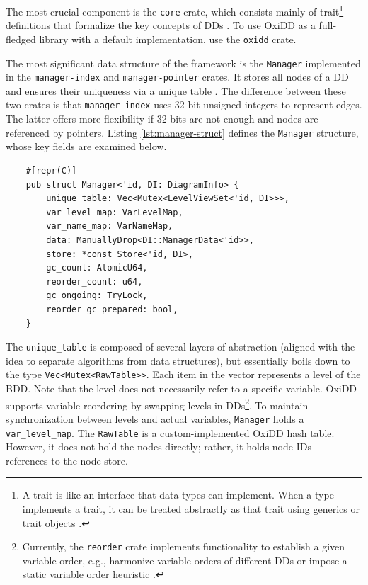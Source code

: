 The most crucial component is the \texttt{core} crate, which consists mainly of trait\footnote{A trait is like an
interface that data types can implement. When a type implements a trait, it can be treated abstractly as that trait
using generics or trait objects \cite[keyword.trait]{rust-docs}.} definitions that formalize the key concepts of DDs
\cite{oxidd}. To use OxiDD as a full-fledged library with a default implementation, use the \texttt{oxidd} crate.

The most significant data structure of the framework is the \texttt{Manager} implemented in the
\texttt{manager-index} and \texttt{manager-pointer} crates. It stores all nodes of a DD and ensures their uniqueness
via a unique table \cite{oxidd}. The difference between these two crates is that \texttt{manager-index} uses 32-bit
unsigned integers to represent edges. The latter offers more flexibility if 32 bits are not enough and nodes are
referenced by pointers. Listing \ref{lst:manager-struct} defines the \texttt{Manager} structure, whose key fields are
examined below.


\begin{listing}[htbp]
    \caption{Definition of the \texttt{Manager} struct in the \texttt{manager-index} crate.}
    \label{lst:manager-struct}
    \begin{verbatim}
    #[repr(C)]
    pub struct Manager<'id, DI: DiagramInfo> {
        unique_table: Vec<Mutex<LevelViewSet<'id, DI>>>,
        var_level_map: VarLevelMap,
        var_name_map: VarNameMap,
        data: ManuallyDrop<DI::ManagerData<'id>>,
        store: *const Store<'id, DI>,
        gc_count: AtomicU64,
        reorder_count: u64,
        gc_ongoing: TryLock,
        reorder_gc_prepared: bool,
    }
    \end{verbatim}
\end{listing}

The \texttt{unique\_table} is composed of several layers of abstraction (aligned with the idea to separate algorithms
from data structures), but essentially boils down to the type \texttt{Vec<Mutex<RawTable>>}. Each item in the vector
represents a level of the BDD. Note that the level does not necessarily refer to a specific variable. OxiDD supports
variable reordering by swapping levels in DDs\footnote{Currently, the \texttt{reorder} crate implements functionality
to establish a given variable order, e.g., harmonize variable orders of different DDs or impose a static variable
order heuristic \cite{oxidd}.}. To maintain synchronization between levels and actual variables, \texttt{Manager}
holds a \texttt{var\_level\_map}. The \texttt{RawTable} is a custom-implemented OxiDD hash table. However, it does not
hold the nodes directly; rather, it holds node IDs --- references to the node store.

